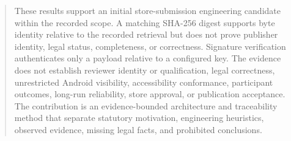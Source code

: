 \documentclass[11pt,a4paper]{article}
\begin{document}
\begin{abstract}
These results support an initial store-submission engineering candidate within the recorded scope. A matching SHA-256 digest supports byte identity relative to the recorded retrieval but does not prove publisher identity, legal status, completeness, or correctness. Signature verification authenticates only a payload relative to a configured key. The evidence does not establish reviewer identity or qualification, legal correctness, unrestricted Android visibility, accessibility conformance, participant outcomes, long-run reliability, store approval, or publication acceptance. The contribution is an evidence-bounded architecture and traceability method that separate statutory motivation, engineering heuristics, observed evidence, missing legal facts, and prohibited conclusions.
\end{abstract}
\newpage
\tableofcontents
\newpage







{\small


}
\end{document}
